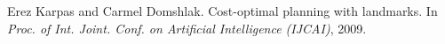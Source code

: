 \begin{thebibliography}{10}
\footnotesize

Erez Karpas and Carmel Domshlak.
\newblock Cost-optimal planning with landmarks.
\newblock In {\em Proc. of Int. Joint. Conf. on Artificial Intelligence
({IJCAI})}, 2009.
\end{thebibliography}
